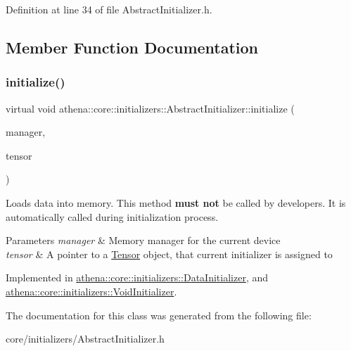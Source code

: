 Definition at line 34 of file Abstract\+Initializer.\+h.



\subsection{Member Function Documentation}
\mbox{\label{classathena_1_1core_1_1initializers_1_1_abstract_initializer_a9c0f0c57add306c9da8ffe8797532f62}} 
\subsubsection{\texorpdfstring{initialize()}{initialize()}}
{\footnotesize\ttfamily virtual void athena\+::core\+::initializers\+::\+Abstract\+Initializer\+::initialize (\begin{DoxyParamCaption}\item[{\mbox{\hyperlink{classathena_1_1backend_1_1_abstract_memory_manager}{athena\+::backend\+::\+Abstract\+Memory\+Manager}} $\ast$}]{manager,  }\item[{\mbox{\hyperlink{classathena_1_1core_1_1_tensor}{Tensor}} $\ast$}]{tensor }\end{DoxyParamCaption})\hspace{0.3cm}{\ttfamily [pure virtual]}}

Loads data into memory. This method {\bfseries must not} be called by developers. It is automatically called during initialization process. 
\begin{DoxyParams}{Parameters}
{\em manager} & Memory manager for the current device \\
\hline
{\em tensor} & A pointer to a \mbox{\hyperlink{classathena_1_1core_1_1_tensor}{Tensor}} object, that current initializer is assigned to \\
\hline
\end{DoxyParams}


Implemented in \mbox{\hyperlink{classathena_1_1core_1_1initializers_1_1_data_initializer_a984213526b2741e423f230098c71520a}{athena\+::core\+::initializers\+::\+Data\+Initializer}}, and \mbox{\hyperlink{classathena_1_1core_1_1initializers_1_1_void_initializer_adcb637175e8cad5841cb21e53e0e138f}{athena\+::core\+::initializers\+::\+Void\+Initializer}}.



The documentation for this class was generated from the following file\+:\begin{DoxyCompactItemize}
\item 
core/initializers/Abstract\+Initializer.\+h\end{DoxyCompactItemize}
